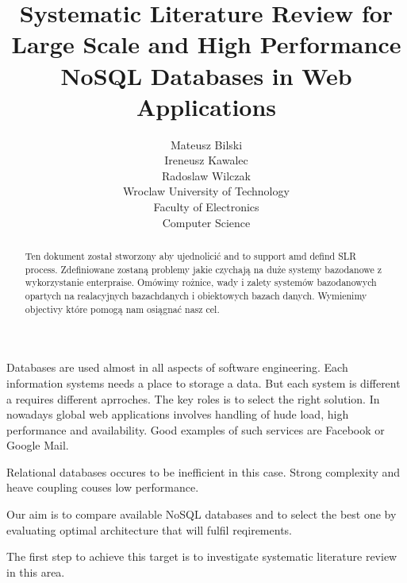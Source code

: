 \documentclass[times, 10pt,twocolumn]{article}
\begin{document}
\title{ Systematic Literature Review
       for Large Scale and High Performance NoSQL Databases in Web Applications}

\author{Mateusz Bilski\\ Ireneusz Kawalec \\ Radoslaw Wilczak\\
Wroclaw University of Technology\\ Faculty of Electronics \\ Computer Science
}

\maketitle
\thispagestyle{empty}

\begin{abstract}

Ten dokument został stworzony aby ujednolicić and to support amd defind SLR process. 
Zdefiniowane zostaną problemy jakie czychają na duże systemy bazodanowe z wykorzystanie enterpraise.
Omówimy rożnice, wady i zalety systemów bazodanowych opartych na realacyjnych bazachdanych i obiektowych bazach danych.
Wymienimy objectivy które pomogą nam osiągnać nasz cel. 

\end{abstract}




Databases are used almost in all aspects of software engineering. Each 
information systems needs a place to storage a data. But each system is different
a requires different aprroches. The key roles is to select the right solution.
In nowadays global web applications involves handling of hude load, high performance and
availability. Good examples of such services are Facebook or Google Mail.

Relational databases occures to be inefficient in this case. Strong complexity and
heave coupling couses low performance.




Our aim is to compare available NoSQL databases and to select the best one by evaluating 
optimal architecture that will fulfil reqirements. 

The first step to achieve this target is to investigate systematic literature review in this area. 
\end{document}
